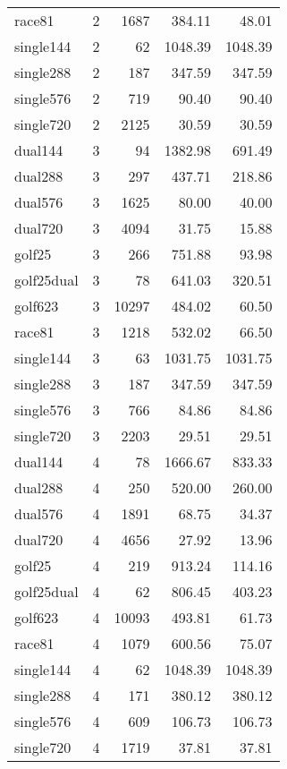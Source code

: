 \begin{longtable}[\textwidth]{lrrrr}
race81		&	2	&	1687	&	384.11	&	48.01	\\ \rowcolor{gray!15}
single144	&	2	&	62		&	1048.39	&	1048.39	\\
single288	&	2	&	187		&	347.59	&	347.59	\\ \rowcolor{gray!15}
single576	&	2	&	719		&	90.40	&	90.40	\\
single720	&	2	&	2125	&	30.59	&	30.59	\\ \rowcolor{gray!15}
dual144		&	3	&	94		&	1382.98	&	691.49	\\
dual288		&	3	&	297		&	437.71	&	218.86	\\ \rowcolor{gray!15}
dual576		&	3	&	1625	&	80.00	&	40.00	\\
dual720		&	3	&	4094	&	31.75	&	15.88	\\ \rowcolor{gray!15}
golf25		&	3	&	266		&	751.88	&	93.98	\\
golf25dual	&	3	&	78		&	641.03	&	320.51	\\ \rowcolor{gray!15}
golf623		&	3	&	10297	&	484.02	&	60.50	\\
race81		&	3	&	1218	&	532.02	&	66.50	\\ \rowcolor{gray!15}
single144	&	3	&	63		&	1031.75	&	1031.75	\\
single288	&	3	&	187		&	347.59	&	347.59	\\ \rowcolor{gray!15}
single576	&	3	&	766		&	84.86	&	84.86	\\
single720	&	3	&	2203	&	29.51	&	29.51	\\ \rowcolor{gray!15}
dual144		&	4	&	78		&	1666.67	&	833.33	\\
dual288		&	4	&	250		&	520.00	&	260.00	\\ \rowcolor{gray!15}
dual576		&	4	&	1891	&	68.75	&	34.37	\\
dual720		&	4	&	4656	&	27.92	&	13.96	\\ \rowcolor{gray!15}
golf25		&	4	&	219		&	913.24	&	114.16	\\
golf25dual	&	4	&	62		&	806.45	&	403.23	\\ \rowcolor{gray!15}
golf623		&	4	&	10093	&	493.81	&	61.73	\\
race81		&	4	&	1079	&	600.56	&	75.07	\\ \rowcolor{gray!15}
single144	&	4	&	62		&	1048.39	&	1048.39	\\
single288	&	4	&	171		&	380.12	&	380.12	\\ \rowcolor{gray!15}
single576	&	4	&	609		&	106.73	&	106.73	\\
single720	&	4	&	1719	&	37.81	&	37.81	\\
\bottomrule[1.5pt]
\end{longtable}
